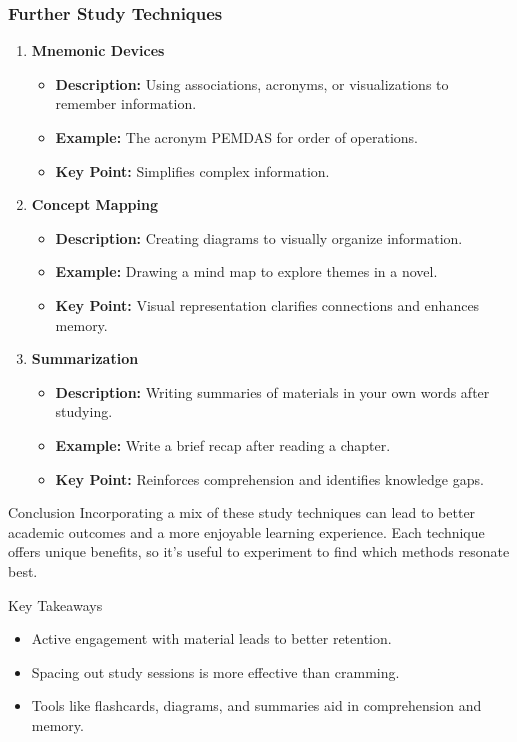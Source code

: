 \documentclass[aspectratio=169]{beamer}
\begin{document}
\begin{frame}[fragile]
    \frametitle{Further Study Techniques}
    \begin{enumerate}[resume]
        \item \textbf{Mnemonic Devices}
            \begin{itemize}
                \item \textbf{Description:} Using associations, acronyms, or visualizations to remember information.
                \item \textbf{Example:} The acronym PEMDAS for order of operations.
                \item \textbf{Key Point:} Simplifies complex information.
            \end{itemize}
        
        \item \textbf{Concept Mapping}
            \begin{itemize}
                \item \textbf{Description:} Creating diagrams to visually organize information.
                \item \textbf{Example:} Drawing a mind map to explore themes in a novel.
                \item \textbf{Key Point:} Visual representation clarifies connections and enhances memory.
            \end{itemize}
        
        \item \textbf{Summarization}
            \begin{itemize}
                \item \textbf{Description:} Writing summaries of materials in your own words after studying.
                \item \textbf{Example:} Write a brief recap after reading a chapter.
                \item \textbf{Key Point:} Reinforces comprehension and identifies knowledge gaps.
            \end{itemize}
    \end{enumerate}

    \begin{block}{Conclusion}
        Incorporating a mix of these study techniques can lead to better academic outcomes and a more enjoyable learning experience. Each technique offers unique benefits, so it's useful to experiment to find which methods resonate best.
    \end{block}
    
    \begin{block}{Key Takeaways}
        \begin{itemize}
            \item Active engagement with material leads to better retention.
            \item Spacing out study sessions is more effective than cramming.
            \item Tools like flashcards, diagrams, and summaries aid in comprehension and memory.
        \end{itemize}
    \end{block}
\end{frame}
\end{document}
